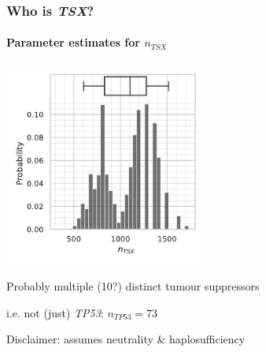 \documentclass{beamer}
\begin{document}
\begin{frame}
    \frametitle{Who is \emph{TSX}?}
    \framesubtitle{Parameter estimates for $n_{TSX}$}

    \begin{center}
        \includegraphics[width=0.5\textwidth]{figures/TSXhistogram}
    \end{center}

    \begin{center}
        \small{Probably multiple (10?) distinct tumour suppressors} 

        \;

        \huge{i.e. not (just) \emph{TP53}: $n_{TP53} = 73$}

        \;

        \small{Disclaimer: assumes neutrality \& haplosufficiency}
    \end{center}

\end{frame}

%
\end{document}
